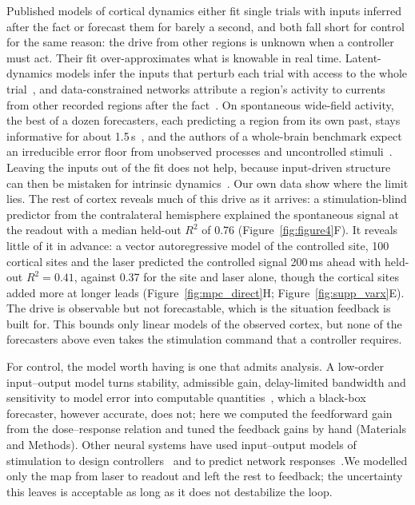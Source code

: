 Published models of cortical dynamics either fit single trials with inputs inferred after the fact or forecast them for barely a second, and both fall short for control for the same reason: the drive from other regions is unknown when a controller must act. Their fit over-approximates what is knowable in real time. Latent-dynamics models infer the inputs that perturb each trial with access to the whole trial~\citep{pandarinath2018lfads}, and data-constrained networks attribute a region's activity to currents from other recorded regions after the fact~\citep{perich2026curbd}. On spontaneous wide-field activity, the best of a dozen forecasters, each predicting a region from its own past, stays informative for about 1.5\,s~\citep{lu2025benchmarking}, and the authors of a whole-brain benchmark expect an irreducible error floor from unobserved processes and uncontrolled stimuli~\citep{lueckmann2025zapbench}. Leaving the inputs out of the fit does not help, because input-driven structure can then be mistaken for intrinsic dynamics~\citep{vahidi2024intrinsic}. Our own data show where the limit lies. The rest of cortex reveals much of this drive as it arrives: a stimulation-blind predictor from the contralateral hemisphere explained the spontaneous signal at the readout with a median held-out $R^2$ of 0.76 (Figure~\ref{fig:figure4}F). It reveals little of it in advance: a vector autoregressive model of the controlled site, 100 cortical sites and the laser predicted the controlled signal 200\,ms ahead with held-out $R^2 = 0.41$, against 0.37 for the site and laser alone, though the cortical sites added more at longer leads (Figure~\ref{fig:mpc_direct}H; Figure~\ref{fig:supp_varx}E). The drive is observable but not forecastable, which is the situation feedback is built for. This bounds only linear models of the observed cortex, but none of the forecasters above even takes the stimulation command that a controller requires.

For control, the model worth having is one that admits analysis. A low-order input--output model turns stability, admissible gain, delay-limited bandwidth and sensitivity to model error into computable quantities~\citep{astrom2008feedback,skogestad2005multivariable}, which a black-box forecaster, however accurate, does not; here we computed the feedforward gain from the dose--response relation and tuned the feedback gains by hand (Materials and Methods). Other neural systems have used input--output models of stimulation to design controllers~\citep{Yang2018} and to predict network responses~\citep{Yang2021}.We modelled only the map from laser to readout and left the rest to feedback; the uncertainty this leaves is acceptable as long as it does not destabilize the loop.

